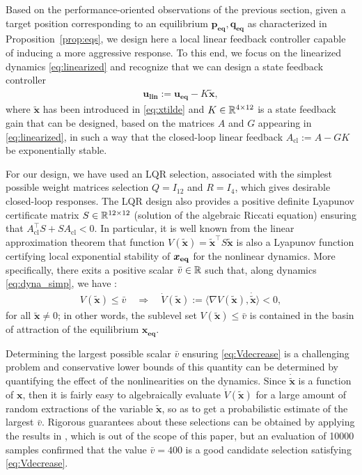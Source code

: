 Based on the performance-oriented observations of the previous section, given a target position corresponding to an equilibrium $\boldsymbol{p_{\text{eq}}}, \boldsymbol{q_{\text{eq}}}$ as characterized in Proposition~\ref{prop:eqs}, we design here a local linear feedback controller capable of inducing a more aggressive response. To this end, we focus on the linearized dynamics \eqref{eq:linearized} and recognize that we can design 
a state feedback controller 
\begin{align}
  \boldsymbol{u_{\text{lin}}} := \boldsymbol{u_{\text{eq}}} - K \boldsymbol{\tilde x},
\label{eq:u_lin}
\end{align}
where $\boldsymbol{\tilde x}$ has been introduced in \eqref{eq:xtilde} and $K \in {\mathbb R}^{4 \times 12}$ is a state feedback gain that can be designed, based on the matrices $A$ and $G$ appearing in \eqref{eq:linearized}, in such a way that the closed-loop linear feedback $A_{\text{cl}}:=A-GK$ be exponentially stable. 

For our design, we have used an LQR selection, associated with the simplest possible weight matrices selection $Q = I_{12}$ and $R = I_{4}$, which gives desirable closed-loop responses. The LQR design also provides a positive definite Lyapunov certificate matrix $S \in {\mathbb R}^{12 \times 12}$ (solution of the algebraic Riccati equation) ensuring that $A_{\text{cl}}^\top S + S A_{\text{cl}} <0$. In particular, it is well known from the linear approximation theorem that function $V(\boldsymbol{\tilde x}) = \boldsymbol{\tilde x}^\top S \boldsymbol{\tilde x}$ is also a Lyapunov function certifying local exponential stability of $\boldsymbol{x_{\rm eq}}$ for the nonlinear dynamics. More specifically, there exits a positive scalar $\bar v \in {\mathbb R}$ such that, along dynamics \eqref{eq:dyna_simp}, we have :
\begin{align}
\label{eq:Vdecrease}
  V(\boldsymbol{\tilde x}) \leq \bar v \quad \Rightarrow \quad \dot V(\boldsymbol{\tilde x}) := \langle 
\nabla V(\boldsymbol{\tilde x}), \boldsymbol{\dot{\tilde x}}\rangle <0,
\end{align}
for all $\boldsymbol{\tilde x} \neq 0$; in other words, the sublevel set $V(\boldsymbol{\tilde x}) \leq \bar v$ is contained in the basin of attraction of the equilibrium $\boldsymbol{x_{\text{eq}}}$.
 
Determining the largest possible scalar $\bar v$ ensuring \eqref{eq:Vdecrease} is a challenging problem and conservative lower bounds of this quantity can be determined by quantifying the effect of the nonlinearities on the dynamics. Since $\boldsymbol{\dot{\tilde x}}$ is a function of $\boldsymbol{x}$, then it is fairly easy to algebraically evaluate $\dot V(\boldsymbol{\tilde x})$ for a large amount of random extractions of the variable $\boldsymbol{\tilde x}$, so as to get a probabilistic estimate of the largest $\bar v$. Rigorous guarantees about these selections can be obtained by applying the results in \cite{tempo2013randomized}, which is out of the scope of this paper, but an evaluation of 10000 samples confirmed that the value $\bar v = 400$  is a good candidate selection satisfying \eqref{eq:Vdecrease}.

